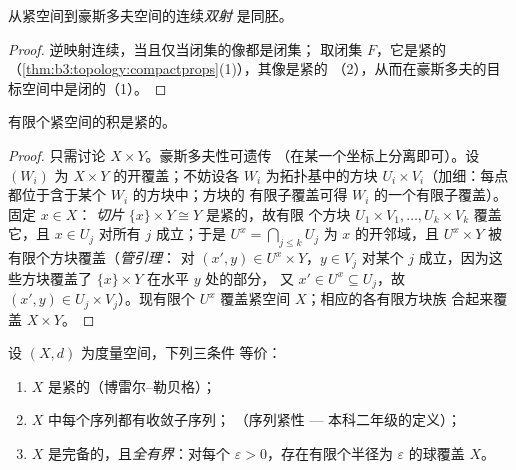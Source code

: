 \begin{corollary}\label{cor:b3:topology:compacthomeo}
从紧空间到豪斯多夫空间的连续\emph{双射}
是同胚。
\end{corollary}

\begin{proof}
逆映射连续，当且仅当闭集的像都是闭集；
取闭集 $F$，它是紧的
（\cref{thm:b3:topology:compactprops}(1)），其像是紧的
（2），从而在豪斯多夫的目标空间中是闭的（1）。
\end{proof}

\begin{theorem}[有限积]\label{thm:b3:topology:tychonoff}
有限个紧空间的积是紧的。
\end{theorem}

\begin{proof}
只需讨论 $X \times Y$。豪斯多夫性可遗传
（在某一个坐标上分离即可）。设 $(W_i)$ 为 $X
\times Y$ 的开覆盖；不妨设各 $W_i$ 为拓扑基中的方块 $U_i \times
V_i$（加细：每点都位于含于某个 $W_i$ 的方块中；方块的
有限子覆盖可得 $W_i$ 的一个有限子覆盖）。固定 $x \in X$：
\emph{切片} $\{x\}\times Y \cong Y$ 是紧的，故有限
个方块 $U_1\times V_1, \dots, U_k\times V_k$ 覆盖它，且
$x \in U_j$ 对所有 $j$ 成立；于是 $U^x = \bigcap_{j \leq k} U_j$ 为
$x$ 的开邻域，且 $U^x \times Y$ 被
有限个方块覆盖（\emph{管引理}：
对 $(x', y) \in U^x \times Y$，$y \in V_j$
对某个 $j$ 成立，因为这些方块覆盖了 $\{x\}\times Y$ 在水平 $y$ 处的部分，
又 $x' \in U^x \subseteq U_j$，故 $(x', y) \in U_j
\times V_j$）。现有限个 $U^x$
覆盖紧空间 $X$；相应的各有限方块族
合起来覆盖 $X \times Y$。
\end{proof}

\begin{theorem}[度量空间中的紧性]
\label{thm:b3:topology:metriccompact}
设 $(X, d)$ 为度量空间，下列三条件
等价：
\begin{enumerate}
  \item $X$ 是紧的（博雷尔–勒贝格）；
  \item $X$ 中每个序列都有收敛子序列；
        （序列紧性 --- 本科二年级的定义）；
  \item $X$ 是完备的，且\emph{全有界}：对每个
        $\varepsilon > 0$，存在有限个半径为
        $\varepsilon$ 的球覆盖 $X$。
\end{enumerate}
\end{theorem}

